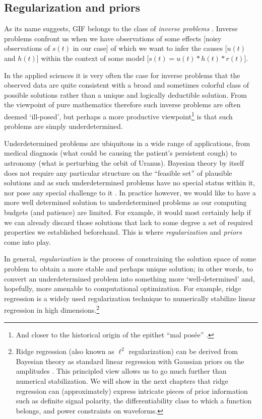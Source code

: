 \begin{chapterappendices}{1}
	
\section{Regularization and priors\label{app:regularization}}
	
As its name suggests, GIF belongs to the class of \emph{inverse problems} \citep{LeBesnerais2010}.
Inverse problems confront us when we have observations of some effects [noisy observations of $s(t)$ in our case] of which we want to infer the causes [$u(t)$ and $h(t)$] within the context of some model [$s(t) = u(t) * h(t) * r(t)$].

In the applied sciences it is very often the case for inverse problems that the observed data are quite consistent with a broad and sometimes colorful class of possible solutions rather than a unique and logically deductible solution.
From the viewpoint of pure mathematics therefore such inverse problems are often deemed `ill-posed', but perhaps a more productive viewpoint\footnote{And closer to the historical origin of the epithet ``mal posée'' \citep{Jaynes1984a}.} is that such problems are simply underdetermined.%

Underdetermined problems are ubiquitous in a wide range of applications, from medical diagnosis (what could be causing the patient's persistent cough) to astronomy (what is perturbing the orbit of Uranus).
Bayesian theory by itself does not require any particular structure on the ``feasible set'' of plausible solutions and as such underdetermined problems have no special status within it, nor pose any special challenge to it \citep{Jaynes2003}.
In practice however, we would like to have a more well determined solution to underdetermined problems as our computing budgets (and patience) are limited.
For example, it would most certainly help if we can already discard those solutions that lack to some degree a set of required properties we established beforehand.
This is where \emph{regularization} and \emph{priors} come into play.

In general, \emph{regularization} is the process of constraining the solution space of some problem to obtain a more stable and perhaps unique solution; in other words, to convert an underdetermined problem into something more `well-determined' and, hopefully, more amenable to computational optimization.
For example, ridge regression is a widely used regularization technique to numerically stabilize linear regression in high dimensions.\footnote{%
	Ridge regression (also known as $\ell^2$ regularization) can be derived from Bayesian theory as standard linear regression with Gaussian priors on the amplitudes \citep[][Sec.~11.3]{Murphy2022}.
	This principled view allows us to go much further than numerical stabilization.
	We will show in the next chapters that ridge regression can (approximately) express intricate pieces of prior information such as definite signal polarity, the differentiability class to which a function belongs, and power constraints on waveforms.
}


\end{chapterappendices}
